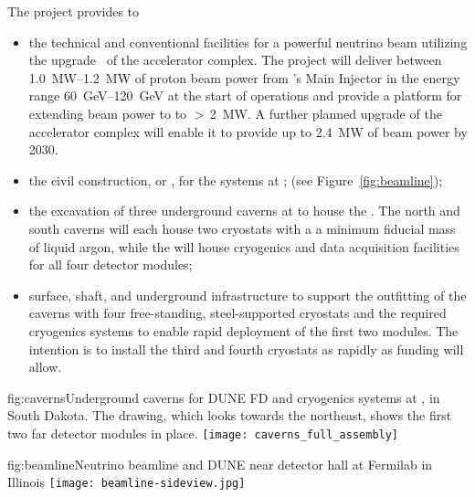 The  project provides to 
\begin{itemize}
\item  the  technical and conventional facilities for a powerful neutrino beam utilizing the  upgrade~\cite{pip2-2013} of the  accelerator 
complex. The  project will deliver between \SIrange{1.0}{1.2}{MW} of proton beam power from 's Main Injector in the energy range  \SIrange{60}{120}{GeV} at the start of  operations and provide a platform for extending beam power to  to %
$>\,$\SI{2}{MW}. %
A further planned upgrade 
of the accelerator complex will enable it to provide up to \SI{2.4}{\MW} of beam power by 2030. 

\item  the civil construction, or , for the  systems at ; (see Figure~\ref{fig:beamline});

\item the excavation of three underground caverns at  to house the . The north and south caverns will each house two cryostats with a
a minimum \nominalmodsize fiducial mass of liquid argon, while the  will house cryogenics and data acquisition facilities for all four detector modules;

\item surface, shaft, and underground infrastructure to support 
the outfitting of the caverns with four free-standing, steel-supported cryostats 
and the required cryogenics systems to enable rapid deployment of the first two \nominalmodsize {} modules. 
The intention is to install the third and fourth cryostats as rapidly as funding will 
allow.

\end{itemize}

\begin{dunefigure}{fig:caverns}{Underground caverns for DUNE FD and cryogenics systems at , in South Dakota. The drawing, which looks towards the northeast, shows the first two far detector modules in place.}
\texttt{[image: caverns\_full\_assembly]}
\end{dunefigure}

\begin{dunefigure}{fig:beamline}{Neutrino beamline and DUNE near detector hall at Fermilab in Illinois}
\texttt{[image: beamline-sideview.jpg]}
\end{dunefigure}



